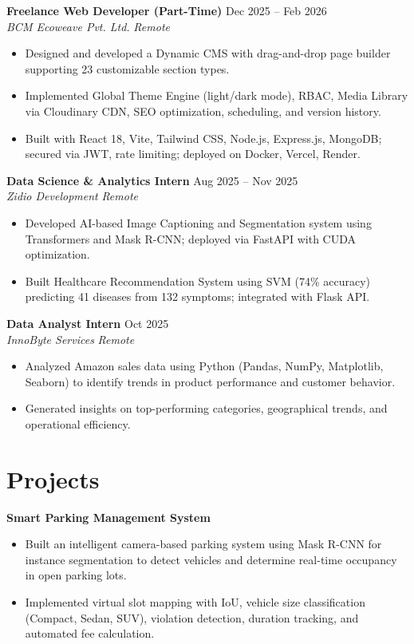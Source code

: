 \documentclass[a4paper,10pt]{article}
\begin{document}
\textbf{Freelance Web Developer (Part-Time)} \hfill Dec 2025 -- Feb 2026\\
\textit{BCM Ecoweave Pvt. Ltd.} \hfill \textit{Remote}
\begin{itemize}
  \item Designed and developed a Dynamic CMS with drag-and-drop page builder supporting 23 customizable section types.
  \item Implemented Global Theme Engine (light/dark mode), RBAC, Media Library via Cloudinary CDN, SEO optimization, scheduling, and version history.
  \item Built with React 18, Vite, Tailwind CSS, Node.js, Express.js, MongoDB; secured via JWT, rate limiting; deployed on Docker, Vercel, Render.
\end{itemize}

\textbf{Data Science \& Analytics Intern} \hfill Aug 2025 -- Nov 2025\\
\textit{Zidio Development} \hfill \textit{Remote}
\begin{itemize}
  \item Developed AI-based Image Captioning and Segmentation system using Transformers and Mask R-CNN; deployed via FastAPI with CUDA optimization.
  \item Built Healthcare Recommendation System using SVM (74\% accuracy) predicting 41 diseases from 132 symptoms; integrated with Flask API.
\end{itemize}

\textbf{Data Analyst Intern} \hfill Oct 2025\\
\textit{InnoByte Services} \hfill \textit{Remote}
\begin{itemize}
  \item Analyzed Amazon sales data using Python (Pandas, NumPy, Matplotlib, Seaborn) to identify trends in product performance and customer behavior.
  \item Generated insights on top-performing categories, geographical trends, and operational efficiency.
\end{itemize}

\section*{Projects}

\textbf{Smart Parking Management System}
\begin{itemize}
  \item Built an intelligent camera-based parking system using Mask R-CNN for instance segmentation to detect vehicles and determine real-time occupancy in open parking lots.
  \item Implemented virtual slot mapping with IoU, vehicle size classification (Compact, Sedan, SUV), violation detection, duration tracking, and automated fee calculation.
\end{itemize}
\end{document}
